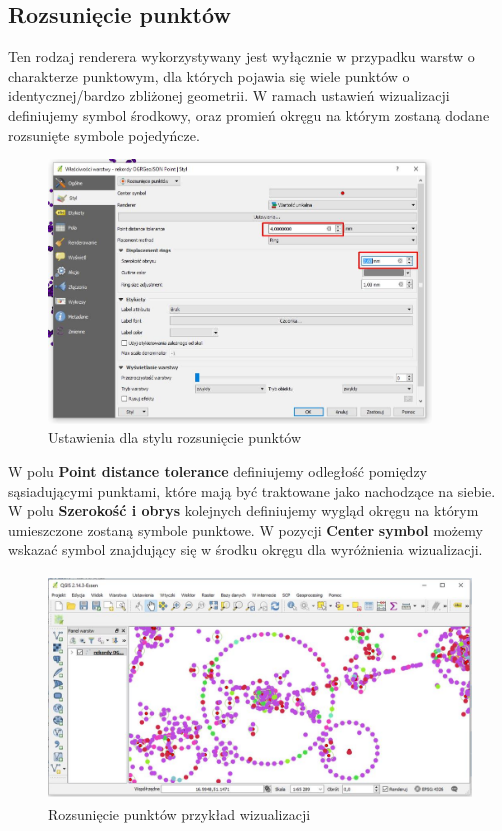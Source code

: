 \documentclass[12pt,a4paper]{book}
\begin{document}
\subsection{Rozsunięcie punktów}
Ten rodzaj renderera wykorzystywany jest wyłącznie w przypadku warstw o charakterze punktowym, dla których pojawia się wiele punktów o identycznej/bardzo zbliżonej geometrii. W ramach ustawień wizualizacji definiujemy symbol środkowy, oraz promień okręgu na którym zostaną dodane rozsunięte symbole pojedyńcze.
\begin{figure}[!ht]
	\centering
	\includegraphics[height=7cm]{007-rozsuniecie.jpg}
	\caption{Ustawienia dla stylu rozsunięcie punktów}
\end{figure}
W polu \textbf{Point distance tolerance} definiujemy odległość pomiędzy sąsiadującymi punktami, które mają być traktowane jako nachodzące na siebie. W polu \textbf{Szerokość i obrys} kolejnych definiujemy wygląd okręgu na którym umieszczone zostaną symbole punktowe. W pozycji \textbf{Center} \textbf{symbol} możemy wskazać symbol znajdujący się w środku okręgu dla wyróżnienia wizualizacji.
\begin{figure}[!ht]
	\centering
	\includegraphics[height=6cm]{007-rozs-wiz.jpg}
	\caption{Rozsunięcie punktów przykład wizualizacji}
\end{figure}
\end{document}
